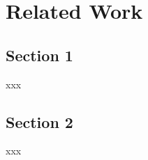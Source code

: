
\chapter{Related Work}
\label{chapter:related_work}
\localtableofcontents


\section{Section 1}
xxx

\section{Section 2}
xxx
